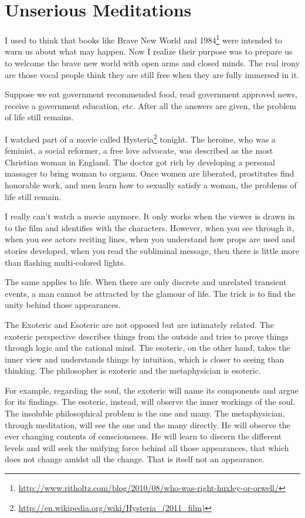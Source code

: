 \section{Unserious Meditations}

I used to think that books like Brave New World and 1984\footnote{\url{http://www.ritholtz.com/blog/2010/08/who-was-right-huxley-or-orwell/}} were intended to warn us about what may happen. Now I realize their purpose was to prepare us to welcome the brave new world with open arms and closed minds. The real irony are those vocal people think they are still free when they are fully immersed in it.

Suppose we eat government recommended food, read government approved news, receive a government education, etc. After all the answers are given, the problem of life still remains.

I watched part of a movie called Hysteria\footnote{\url{http://en.wikipedia.org/wiki/Hysteria_(2011_film)}} tonight. The heroine, who was a feminist, a social reformer, a free love advocate, was described as the most Christian woman in England. The doctor got rich by developing a personal massager to bring woman to orgasm. Once women are liberated, prostitutes find honorable work, and men learn how to sexually satisfy a woman, the problems of life still remain.

I really can't watch a movie anymore. It only works when the viewer is drawn in to the film and identifies with the characters. However, when you see through it, when you see actors reciting lines, when you understand how props are used and stories developed, when you read the subliminal message, then there is little more than flashing multi-colored lights.

The same applies to life. When there are only discrete and unrelated transient events, a man cannot be attracted by the glamour of life. The trick is to find the unity behind those appearances.

The Exoteric and Esoteric are not opposed but are intimately related. The exoteric perspective describes things from the outside and tries to prove things through logic and the rational mind. The esoteric, on the other hand, takes the inner view and understands things by intuition, which is closer to seeing than thinking. The philosopher is exoteric and the metaphysician is esoteric.

For example, regarding the soul, the exoteric will name its components and argue for its findings. The esoteric, instead, will observe the inner workings of the soul. The insoluble philosophical problem is the one and many. The metaphysician, through meditation, will see the one and the many directly. He will observe the ever changing contents of consciousness. He will learn to discern the different levels and will seek the unifying force behind all those appearances, that which does not change amidst all the change. That is itself not an appearance.


